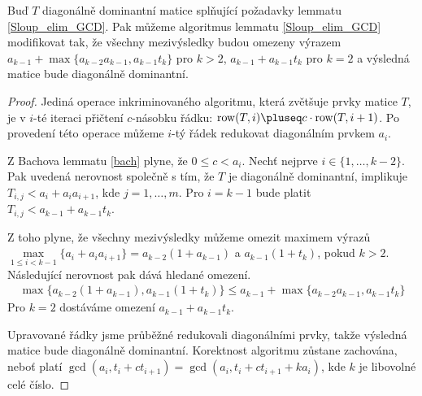 \begin{lem} \label{Sloup_elim_GCD_modified}
Buď $ T $ diagonálně dominantní matice splňující požadavky lemmatu \ref{Sloup_elim_GCD}.
Pak můžeme algoritmus lemmatu \ref{Sloup_elim_GCD} modifikovat tak, že všechny
mezivýsledky budou omezeny výrazem 
$ a_{k - 1} + \max \{ a_{k - 2} a_{k - 1}, a_{k - 1} t_k \} $ pro $ k > 2 $,
$ a_{k - 1} + a_{k - 1} t_k $ pro $ k = 2 $
a výsledná matice bude diagonálně dominantní.
\end{lem}
\begin{proof}
Jediná operace inkriminovaného algoritmu, která zvětšuje prvky matice $ T $, je
v $ i $-té iteraci přičtení $ c $-násobku řádku: 
$ \operatorname{row}(T, i) \pluseq c \cdot \operatorname{row}(T, i + 1) $. Po
provedení této operace můžeme $ i $-tý řádek redukovat diagonálním prvkem $ a_i $.

Z Bachova lemmatu \ref{bach} plyne, že $ 0 \leq c < a_i $. 
Nechť nejprve $ i \in \{1, \dots, k - 2 \} $. Pak uvedená nerovnost společně s
tím, že $ T $ je diagonálně dominantní, implikuje $ T_{i, j} < a_i + a_i a_{i+1} $, kde
$ j = 1, \dots, m $. Pro $ i = k - 1 $ bude platit $ T_{i, j} < a_{k-1} + a_{k - 1} t_k $.

Z toho plyne, že všechny mezivýsledky můžeme omezit maximem výrazů
$ \max\limits_{1 \leq i < k - 1}\{ a_i + a_i a_{i+1} \} = a_{k - 2} ( 1 + a_{k - 1} )$ 
a $ a_{k - 1} ( 1 + t_k )$, pokud $ k > 2 $. Následující nerovnost pak dává 
hledané omezení.
\begin{align*}
    \max \{ a_{k - 2} ( 1 + a_{k - 1}),  a_{k - 1} ( 1 + t_k ) \} 
        \leq  a_{k - 1} + \max \{ a_{k - 2} a_{k - 1}, a_{k - 1} t_k \}
\end{align*}
Pro $ k = 2 $ dostáváme omezení $ a_{k - 1} + a_{k - 1} t_k $.

Upravované řádky jsme průběžné redukovali diagonálními prvky, takže výsledná 
matice bude diagonálně dominantní. Korektnost algoritmu zůstane zachována, 
neboť platí $ \gcd(a_i, t_{i} + ct_{i+1}) = \gcd(a_i, t_{i} + ct_{i+1} + k a_i) $,
kde $ k $ je libovolné celé číslo.
\end{proof}




